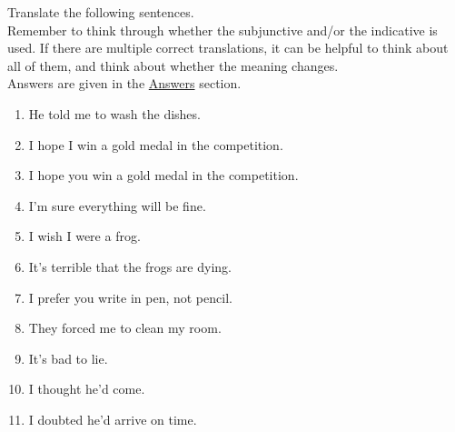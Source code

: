 Translate the following sentences.\\

Remember to think through whether the subjunctive and/or the indicative is used.
If there are multiple correct translations, it can be helpful to think about all
of them, and think about whether the meaning changes. \\

Answers are given in the \hyperref[sec:ans]{Answers} section.

\begin{enumerate}
	\item He told me to wash the dishes.
	\item I hope I win a gold medal in the competition.
	\item I hope you win a gold medal in the competition.
	\item I'm sure everything will be fine.
	\item I wish I were a frog.
	\item It's terrible that the frogs are dying. 
	\item I prefer you write in pen, not pencil.
	\item They forced me to clean my room.
	\item It's bad to lie.
	\item I thought he'd come.
	\item I doubted he'd arrive on time. 
\end{enumerate}
